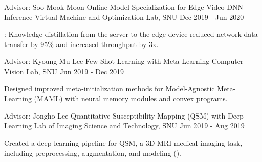\begin{cventries}
  \cventryexp
    {Advisor: Soo-Mook Moon}
    {Online Model Specialization for Edge Video DNN Inference}
    {Virtual Machine and Optimization Lab, SNU}
    {Dec 2019 - Jun 2020}
    {
      \begin{cvitems}
      \item {\href{https://github.com/jaywonchung/shadowtutor}{}: Knowledge distillation from the server to the edge device reduced network data transfer by 95\% and increased throughput by 3x.}
      \end{cvitems}
    }
    
  \cventryexp
    {Advisor: Kyoung Mu Lee}
    {Few-Shot Learning with Meta-Learning}
    {Computer Vision Lab, SNU}
    {Jun 2019 - Dec 2019}
    {
      \begin{cvitems}
        \item {Designed improved meta-initialization methods for Model-Agnostic Meta-Learning (MAML) with neural memory modules and convex programs.}
      \end{cvitems}
    }
    
  \cventryexp
    {Advisor: Jongho Lee}
    {Quantitative Susceptibility Mapping (QSM) with Deep Learning}
    {Lab of Imaging Science and Technology, SNU}
    {Jun 2019 - Aug 2019}
    {
      \begin{cvitems}
      \item {Created a deep learning pipeline for QSM, a 3D MRI medical imaging task, including preprocessing, augmentation, and modeling (\href{https://github.com/jaywonchung/CAD-QSMNet}{}).}
      \end{cvitems}
    }

\end{cventries}

